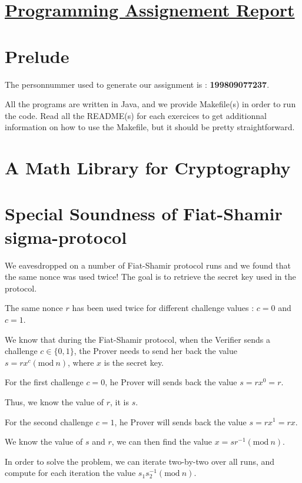 \documentclass[12pt]{article}
\begin{document}
\section* {\underline{Programming Assignement Report}}

\section*{Prelude}

The personnummer used to generate our assignment is : \textbf{{\large 199809077237}}.

All the programs are written in Java, and we provide Makefile(s) in order to run the code. Read all the README(s) for each exercices to get additionnal information on how to use the Makefile, but it should be pretty straightforward.

\section{A Math Library for Cryptography}

\newpage
\section{Special Soundness of Fiat-Shamir sigma-protocol}

We eavesdropped on a number of Fiat-Shamir protocol runs and we found that the same nonce was used twice! The goal is to retrieve the secret key used in the protocol.

The same nonce $r$ has been used twice for different challenge values : $c = 0$ and $c = 1$.

We know that during the Fiat-Shamir protocol, when the Verifier sends a challenge $c \in \{0, 1\}$, the Prover needs to send her back the value $s = r x^c (\textrm{mod}\ n)$, where $x$ is the secret key.

For the first challenge $c = 0$, he Prover will sends back the value $s = r x^0 = r$.

Thus, we know the value of $r$, it is $s$.

For the second challenge $c = 1$, he Prover will sends back the value $s = r x^1 = r x$.

We know the value of $s$ and $r$, we can then find the value $x = s r^{-1} (\textrm{mod}\ n)$.

\vspace{2em}

In order to solve the problem, we can iterate two-by-two over all runs, and compute for each iteration the value $s_{1} s_{2}^{-1} (\textrm{mod}\ n)$.
\end{document}
